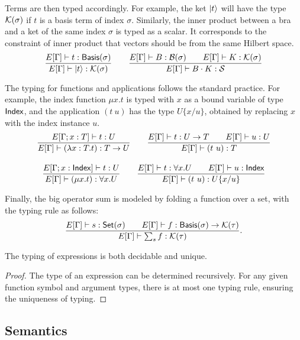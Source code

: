 \documentclass[runningheads]{llncs}
\begin{document}
Terms are then typed accordingly.
For example, the ket \( \ket{t} \) will have the type \( \mathcal{K}(\sigma) \) if \( t \) is a basis term of index \( \sigma \). Similarly, the inner product between a bra and a ket of the same index \( \sigma \) is typed as a scalar. It corresponds to the constraint of inner product that vectors should be from the same Hilbert space.
\begin{gather*}
    \frac{E[\Gamma]\vdash t : \mathsf{Basis}(\sigma)}{E[\Gamma] \vdash \ket{t} : \mathcal{K}(\sigma)}
    \qquad
    \frac{E[\Gamma]\vdash B : \mathcal{B}(\sigma) \qquad E[\Gamma]\vdash K : \mathcal{K}(\sigma)}{E[\Gamma] \vdash B \cdot K : \mathcal{S}}
\end{gather*}

The typing for functions and applications follows the standard practice. For example, the index function \( \mu x. t \) is typed with \( x \) as a bound variable of type \( \mathsf{Index} \), and the application \( (t\ u) \) has the type \( U\{x/u\} \), obtained by replacing \( x \) with the index instance \( u \).
\begin{gather*}
    \frac{E[\Gamma; x : T] \vdash t : U}{E[\Gamma] \vdash (\lambda x : T . t) : T \to U}
    \qquad
    \frac{E[\Gamma] \vdash t:U \to T \qquad E[\Gamma] \vdash u:U}{E[\Gamma] \vdash (t\ u):T} 
    \\[1em]
    \frac{E[\Gamma; x : \mathsf{Index}] \vdash t : U}{E[\Gamma] \vdash (\mu x.t) : \forall x.U}
    \qquad
    \frac{E[\Gamma] \vdash t:\forall x.U \qquad E[\Gamma] \vdash u : \mathsf{Index}}{E[\Gamma] \vdash (t\ u):U\{x/u\}}
\end{gather*}

Finally, the big operator sum is modeled by folding a function over a set, with the typing rule as follows:
\[
    \frac{E[\Gamma] \vdash s : \mathsf{Set}(\sigma) \qquad E[\Gamma] \vdash f : \mathsf{Basis}(\sigma) \to \mathcal{K}(\tau)}{E[\Gamma] \vdash \sum_{s} f : \mathcal{K}(\tau)}.
\]

\begin{lemma}
    The typing of expressions is both decidable and unique.
\end{lemma}

\begin{proof}
    The type of an expression can be determined recursively. For any given function symbol and argument types, there is at most one typing rule, ensuring the uniqueness of typing.
\end{proof}






\subsection{Semantics}
\end{document}
